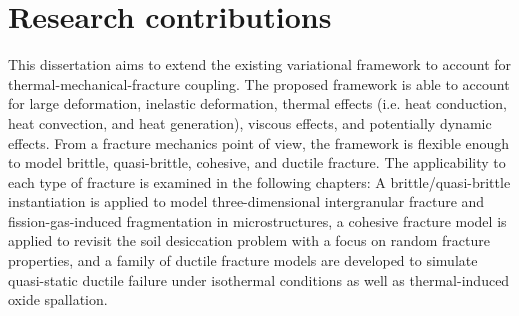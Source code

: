 \section{Research contributions}

This dissertation aims to extend the existing variational framework to account for thermal-mechanical-fracture coupling. The proposed framework is able to account for large deformation, inelastic deformation, thermal effects (i.e. heat conduction, heat convection, and heat generation), viscous effects, and potentially dynamic effects. From a fracture mechanics point of view, the framework is flexible enough to model brittle, quasi-brittle, cohesive, and ductile fracture. The applicability to each type of fracture is examined in the following chapters: A brittle/quasi-brittle instantiation is applied to model three-dimensional intergranular fracture and fission-gas-induced fragmentation in microstructures, a cohesive fracture model is applied to revisit the soil desiccation problem with a focus on random fracture properties, and a family of ductile fracture models are developed to simulate quasi-static ductile failure under isothermal conditions as well as thermal-induced oxide spallation.

